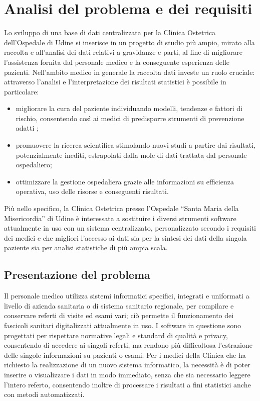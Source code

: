 \chapter{Analisi del problema e dei requisiti}

Lo sviluppo di una base di dati centralizzata per la Clinica Ostetrica dell'Ospedale di Udine si inserisce in un progetto di studio più ampio, mirato alla raccolta e all'analisi dei dati relativi a gravidanze e parti, al fine di migliorare l'assistenza fornita dal personale medico e la conseguente esperienza delle pazienti.
Nell'ambito medico in generale la raccolta dati investe un ruolo cruciale: attraverso l'analisi e l'interpretazione dei risultati statistici è possibile in particolare:
\begin{itemize}
\item migliorare la cura del paziente individuando modelli, tendenze e fattori di rischio, consentendo così ai medici di predisporre strumenti di prevenzione adatti \cite{Cor20,McC16};
\item promuovere la ricerca scientifica stimolando nuovi studi a partire dai risultati, potenzialmente inediti, estrapolati dalla mole di dati trattata dal personale ospedaliero;
\item ottimizzare la gestione ospedaliera grazie alle informazioni su efficienza operativa, uso delle risorse e conseguenti risultati.
\end{itemize}
Più nello specifico, la Clinica Ostetrica presso l'Ospedale \enquote{Santa Maria della Misericordia} di Udine è interessata a sostituire i diversi strumenti software attualmente in uso con un sistema centralizzato, personalizzato secondo i requisiti dei medici e che migliori l'accesso ai dati sia per la sintesi dei dati della singola paziente sia per analisi statistiche di più ampia scala.

\section{Presentazione del problema}
\label{problem}

Il personale medico utilizza sistemi informatici specifici, integrati e uniformati a livello di azienda sanitaria o di sistema sanitario regionale, per compilare e conservare referti di visite ed esami vari; ciò permette il funzionamento dei fascicoli sanitari digitalizzati attualmente in uso.
I software in questione sono progettati per rispettare normative legali e standard di qualità e privacy, consentendo di accedere ai singoli referti, ma rendono più difficoltosa l'estrazione delle singole informazioni su pazienti o esami.
Per i medici della Clinica che ha richiesto la realizzazione di un nuovo sistema informatico, la necessità è di poter inserire o visualizzare i dati in modo immediato, senza che sia necessario leggere l'intero referto, consentendo inoltre di processare i risultati a fini statistici anche con metodi automatizzati.

